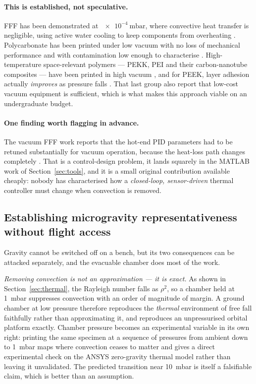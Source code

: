 \documentclass[11pt,a4paper]{article}
\begin{document}
\paragraph{This is established, not speculative.} FFF has been demonstrated at
\(\SI{e-4}{\milli\bar}\), where convective heat transfer is negligible, using
active water cooling to keep components from overheating
\cite{scirep2025vacuumfff}. Polycarbonate has been printed under low vacuum with
no loss of mechanical performance and with contamination low enough to
characterise \cite{ceas2021lowvacuum}. High-temperature space-relevant polymers
--- PEKK, PEI and their carbon-nanotube composites --- have been printed in high
vacuum \cite{jsr2023vacuumfff}, and for PEEK, layer adhesion actually
\emph{improves} as pressure falls \cite{peek_vacuum2025}. That last group also
report that low-cost vacuum equipment is sufficient, which is what makes this
approach viable on an undergraduate budget.

\paragraph{One finding worth flagging in advance.} The vacuum FFF work reports
that the hot-end PID parameters had to be retuned substantially for vacuum
operation, because the heat-loss path changes completely
\cite{scirep2025vacuumfff}. That is a control-design problem, it lands squarely
in the MATLAB work of Section~\ref{sec:tools}, and it is a small original
contribution available cheaply: nobody has characterised how a
\emph{closed-loop, sensor-driven} thermal controller must change when convection
is removed.

\subsection{Establishing microgravity representativeness without flight access}
\label{sec:microg}

Gravity cannot be switched off on a bench, but its two consequences can be
attacked separately, and the evacuable chamber does most of the work.

\emph{Removing convection is not an approximation --- it is exact.} As shown in
Section~\ref{sec:thermal}, the Rayleigh number falls as \(\rho^{2}\), so a
chamber held at \SI{1}{\milli\bar} suppresses convection with an order of
magnitude of margin. A ground chamber at low pressure therefore reproduces the
\emph{thermal} environment of free fall faithfully rather than approximating it,
and reproduces an unpressurised orbital platform exactly. Chamber pressure
becomes an experimental variable in its own right: printing the same specimen at
a sequence of pressures from ambient down to \SI{1}{\milli\bar} maps where
convection ceases to matter and gives a direct experimental check on the ANSYS
zero-gravity thermal model rather than leaving it unvalidated. The predicted
transition near \SI{10}{\milli\bar} is itself a falsifiable claim, which is
better than an assumption.
\end{document}
